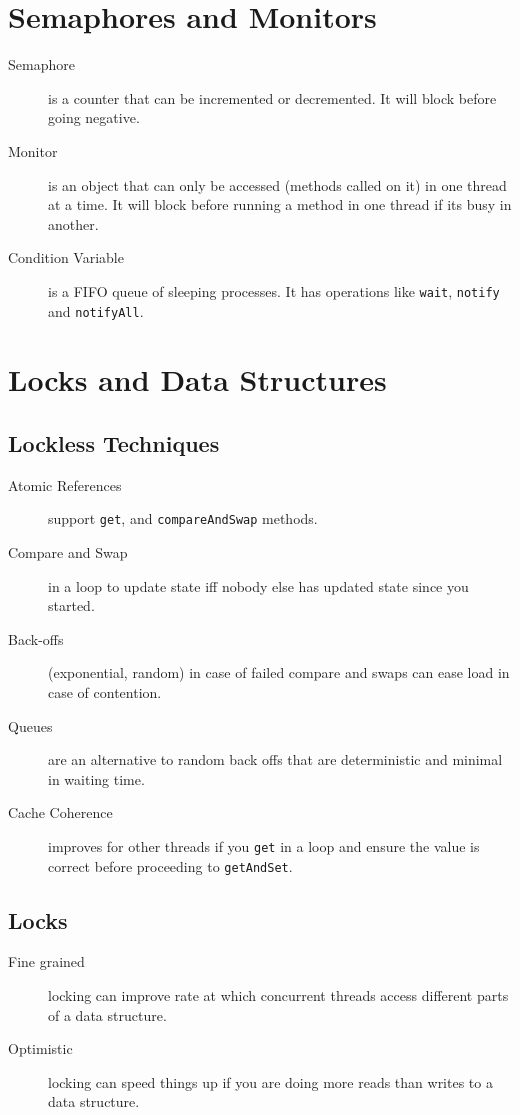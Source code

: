 \documentclass[landscape]{cheat}
\begin{document}
\begin{multicols*}{3}
\section{Semaphores and Monitors}
\begin{description}
    \item[Semaphore] is a counter that can be incremented or decremented.
        It will block before going negative.
    \item[Monitor] is an object that can only be accessed (methods called on it) in one thread at a time.
        It will block before running a method in one thread if its busy in another.
    \item[Condition Variable] is a FIFO queue of sleeping processes.
        It has operations like \lstinline{wait}, \lstinline{notify} and \lstinline{notifyAll}.
\end{description}

\section{Locks and Data Structures}
\subsection{Lockless Techniques}
\begin{description}
    \item[Atomic References] support \lstinline{get}, and \lstinline{compareAndSwap} methods.
    \item[Compare and Swap] in a loop to update state iff nobody else has updated state since you started.
    \item[Back-offs] (exponential, random) in case of failed compare and swaps can ease load in case of contention.
    \item[Queues] are an alternative to random back offs that are deterministic and minimal in waiting time.
    \item[Cache Coherence] improves for other threads if you \lstinline{get} in a loop and ensure the value is correct before proceeding to \lstinline{getAndSet}.
\end{description}

\subsection{Locks}
\begin{description}
    \item[Fine grained] locking can improve rate at which concurrent threads access different parts of a data structure.
    \item[Optimistic] locking can speed things up if you are doing more reads than writes to a data structure.
\end{description}


\end{multicols*}
\end{document}
